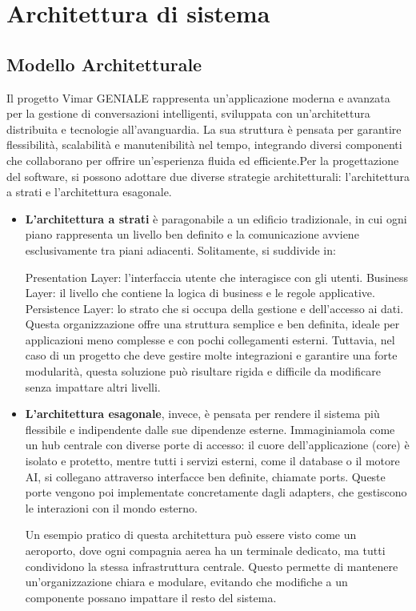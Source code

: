 \section{Architettura di sistema }
\subsection{Modello Architetturale}
Il progetto Vimar GENIALE rappresenta un’applicazione moderna e avanzata per la gestione di conversazioni intelligenti, sviluppata con un’architettura distribuita e tecnologie all’avanguardia. La sua struttura è pensata per garantire flessibilità, scalabilità e manutenibilità nel tempo, integrando diversi componenti che collaborano per offrire un’esperienza fluida ed efficiente.Per la progettazione del software, si possono adottare due diverse strategie architetturali: l’architettura a strati e l’architettura esagonale.
\begin{itemize}
\item \textbf{L’architettura a strati} è paragonabile a un edificio tradizionale, in cui ogni piano rappresenta un livello ben definito e la comunicazione avviene esclusivamente tra piani adiacenti. Solitamente, si suddivide in:

Presentation Layer: l’interfaccia utente che interagisce con gli utenti.
Business Layer: il livello che contiene la logica di business e le regole applicative.
Persistence Layer: lo strato che si occupa della gestione e dell’accesso ai dati.
Questa organizzazione offre una struttura semplice e ben definita, ideale per applicazioni meno complesse e con pochi collegamenti esterni. Tuttavia, nel caso di un progetto che deve gestire molte integrazioni e garantire una forte modularità, questa soluzione può risultare rigida e difficile da modificare senza impattare altri livelli.
\end{itemize}
\begin{itemize}
\item \textbf{L’architettura esagonale}, invece, è pensata per rendere il sistema più flessibile e indipendente dalle sue dipendenze esterne. Immaginiamola come un hub centrale con diverse porte di accesso: il cuore dell’applicazione (core) è isolato e protetto, mentre tutti i servizi esterni, come il database o il motore AI, si collegano attraverso interfacce ben definite, chiamate ports. Queste porte vengono poi implementate concretamente dagli adapters, che gestiscono le interazioni con il mondo esterno.

Un esempio pratico di questa architettura può essere visto come un aeroporto, dove ogni compagnia aerea ha un terminale dedicato, ma tutti condividono la stessa infrastruttura centrale. Questo permette di mantenere un’organizzazione chiara e modulare, evitando che modifiche a un componente possano impattare il resto del sistema.
\end{itemize}

